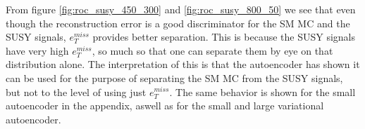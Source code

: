 From figure \ref{fig:roc_susy_450_300} and \ref{fig:roc_susy_800_50} we see that even though the reconstruction error is a good discriminator 
for the SM MC and the SUSY signals, $e_T^{miss}$ provides better separation. This is because the SUSY signals have very high $e_T^{miss}$, 
so much so that one can separate them by eye on that distribution alone. The interpretation of this is that the autoencoder has shown it 
can be used for the purpose of separating the SM MC from the SUSY signals, but not to the level of using just $e_T^{miss}$. 
The same behavior is shown for the small autoencoder in the appendix, aswell as for the small and large variational autoencoder. 